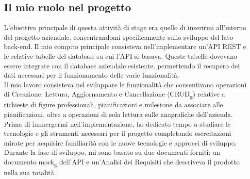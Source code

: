 \subsection{Il mio ruolo nel progetto}

L'obiettivo principale di questa attività di stage era quello di inserirmi all'interno del progetto aziendale, concentrandomi specificamente sullo sviluppo del lato back-end. Il mio compito principale consisteva nell'implementare un'API REST e le relative tabelle del database su cui l'API si basava. Queste tabelle dovevano essere integrate con il database aziendale esistente, permettendo il recupero dei dati necessari per il funzionamento delle varie funzionalità.\\
Il mio lavoro consisteva nel sviluppare le funzionalità che consentivano operazioni di Creazione, Lettura, Aggiornamento e Cancellazione (CRUD\textsubscript{g}) relative a richieste di figure professionali, pianificazioni e milestone da associare alle pianificazioni, oltre a operazioni di sola lettura sulle anagrafiche dell'azienda.\\
Prima di immergermi nell'implementazione, ho dedicato tempo a studiare le tecnologie e gli strumenti necessari per il progetto completando esercitazioni mirate per acquisire familiarità con le nuove tecnologie e approcci di sviluppo.\\
Durante la fase di sviluppo, mi sono basato su due documenti forniti: un documento mock\textsubscript{g} dell'API e un'Analisi dei Requisiti che descriveva il prodotto nella sua totalità.



